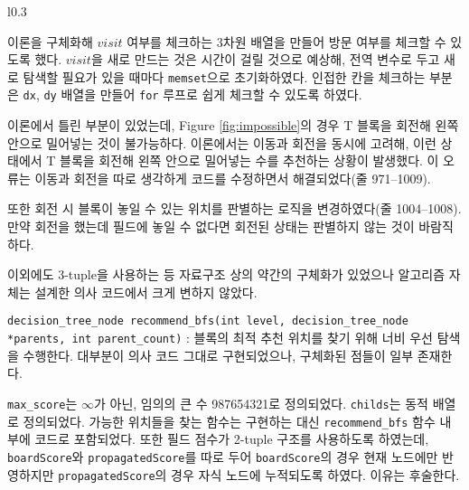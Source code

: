 \begin{wrapfigure}{l}{0.3\textwidth}
\caption{회전 불가능한 T}
\label{fig:impossible}
\end{wrapfigure}

이론을 구체화해 $visit$ 여부를 체크하는 3차원 배열을 만들어 방문 여부를 체크할 수 있도록 했다. $visit$을 새로 만드는 것은 시간이 걸릴 것으로 예상해,
전역 변수로 두고 새로 탐색할 필요가 있을 때마다 \texttt{memset}으로 초기화하였다. 인접한 칸을 체크하는 부분은 \texttt{dx}, \texttt{dy} 배열을
만들어 \texttt{for} 루프로 쉽게 체크할 수 있도록 하였다.

이론에서 틀린 부분이 있었는데, Figure \ref{fig:impossible}의 경우 T 블록을 회전해 왼쪽 안으로 밀어넣는 것이 불가능하다. 이론에서는
이동과 회전을 동시에 고려해, 이런 상태에서 T 블록을 회전해 왼쪽 안으로 밀어넣는 수를 추천하는 상황이 발생했다. 이 오류는 이동과 회전을 따로 생각하게
코드를 수정하면서 해결되었다(줄 971--1009).

또한 회전 시 블록이 놓일 수 있는 위치를 판별하는 로직을 변경하였다(줄 1004--1008). 만약 회전을 했는데 필드에 놓일 수 없다면 회전된 상태는 판별하지
않는 것이 바람직하다.

이외에도 3-tuple을 사용하는 등 자료구조 상의 약간의 구체화가 있었으나 알고리즘 자체는 설계한 의사 코드에서 크게 변하지 않았다.

\texttt{decision_tree_node recommend_bfs(int level, decision_tree_node *parents, int parent_count)}
: 블록의 최적 추천 위치를 찾기 위해 너비 우선 탐색을 수행한다. 대부분이 의사 코드 그대로 구현되었으나, 구체화된 점들이 일부 존재한다.

\texttt{max_score}는 $\infty$가 아닌, 임의의 큰 수 987654321로 정의되었다. \texttt{childs}는 동적 배열로 정의되었다.
가능한 위치들을 찾는 함수는 구현하는 대신 \texttt{recommend_bfs} 함수 내부에 코드로 포함되었다. 또한 필드 점수가 2-tuple 구조를 사용하도록 하였는데,
\texttt{boardScore}와 \texttt{propagatedScore}를 따로 두어 \texttt{boardScore}의 경우 현재 노드에만 반영하지만
\texttt{propagatedScore}의 경우 자식 노드에 누적되도록 하였다. 이유는 후술한다.

